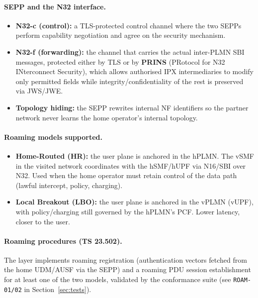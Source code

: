 \documentclass[11pt,a4paper]{report}
\newcommand{\code}[1]{\texttt{\small #1}}
\begin{document}
\paragraph{SEPP and the N32 interface.}
\begin{itemize}[leftmargin=1.4em]
  \item \textbf{N32-c (control):} a TLS-protected control channel where the two SEPPs
        perform capability negotiation and agree on the security mechanism.
  \item \textbf{N32-f (forwarding):} the channel that carries the actual inter-PLMN SBI
        messages, protected either by TLS or by \textbf{PRINS} (PRotocol for N32
        INterconnect Security), which allows authorised IPX intermediaries to modify only
        permitted fields while integrity/confidentiality of the rest is preserved via
        JWS/JWE.
  \item \textbf{Topology hiding:} the SEPP rewrites internal NF identifiers so the partner
        network never learns the home operator's internal topology.
\end{itemize}

\paragraph{Roaming models supported.}
\begin{itemize}[leftmargin=1.4em]
  \item \textbf{Home-Routed (HR):} the user plane is anchored in the hPLMN. The vSMF in the
        visited network coordinates with the hSMF/hUPF via N16/SBI over N32. Used when the
        home operator must retain control of the data path (lawful intercept, policy,
        charging).
  \item \textbf{Local Breakout (LBO):} the user plane is anchored in the vPLMN (vUPF), with
        policy/charging still governed by the hPLMN's PCF. Lower latency, closer to the
        user.
\end{itemize}

\paragraph{Roaming procedures (TS 23.502).} The layer implements roaming registration
(authentication vectors fetched from the home UDM/AUSF via the SEPP) and a roaming PDU
session establishment for at least one of the two models, validated by the conformance
suite (see \code{ROAM-01/02} in Section~\ref{sec:tests}).
\end{document}
